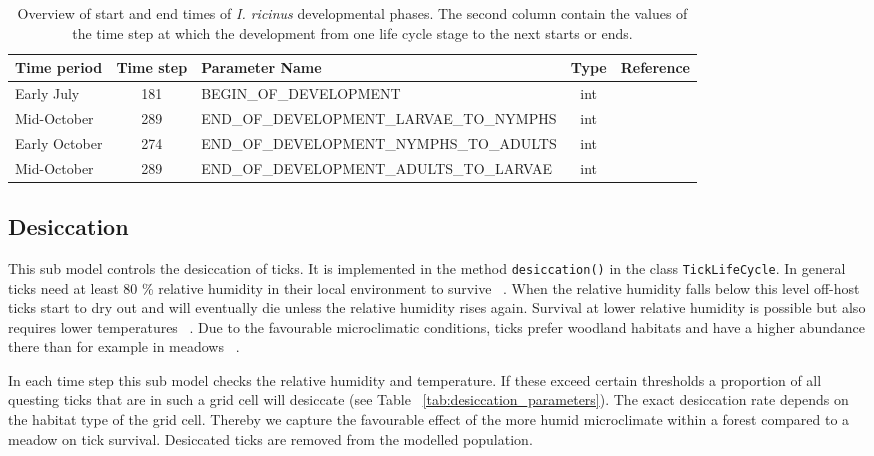 \documentclass[a4paper, 11pt]{scrartcl}
\newcommand{\inlinecode}[1]{\texttt{\small #1}}
\begin{document}
\begin{table}[h!]
\caption[Overview of start and end times of \emph{I. ricinus} developmental phases.]{Overview of start and end times of \emph{I. ricinus} developmental phases. The second column contain the values of the time step at which the development from one life cycle stage to the next starts or ends.}
\label{tab:development_parameters}
\begin{tabularx}{\textwidth}{lclcl}
\toprule
\textbf{Time period} 	& \textbf{Time step} & \textbf{Parameter Name}							& \textbf{Type}    & \textbf{Reference} \\
\midrule
Early July   			& 181   			 & \tiny{BEGIN\_OF\_DEVELOPMENT}					& int      & \textcite{Kahl}   		\\
Mid-October     		& 289      			 & \tiny{END\_OF\_DEVELOPMENT\_LARVAE\_TO\_NYMPHS}	& int      & \textcite{Kahl}      	\\
Early October    		& 274    			 & \tiny{END\_OF\_DEVELOPMENT\_NYMPHS\_TO\_ADULTS}	& int      & \textcite{Kahl}     	\\
Mid-October     		& 289      			 & \tiny{END\_OF\_DEVELOPMENT\_ADULTS\_TO\_LARVAE}	& int      & \textcite{Kahl}			\\
\bottomrule
\end{tabularx}
\end{table}

\subsection{Desiccation}
This sub model controls the desiccation of ticks. It is implemented in the method \inlinecode{desiccation()} in the class \inlinecode{TickLifeCycle}. In general ticks need at least 80 \% relative humidity in their local environment to survive ~\parencite{Medlock.2013, Gray.2016, Hauser.2018}. When the relative humidity falls below this level off-host ticks start to dry out and will eventually die unless the relative humidity rises again. Survival at lower relative humidity is possible but also requires lower temperatures ~\parencite{Ostfeld.2015}. Due to the favourable microclimatic conditions, ticks prefer woodland habitats and have a higher abundance there than for example in meadows ~\parencite{Lindstrom.2003, Boehnke.2015}.

In each time step this sub model checks the relative humidity and temperature. If these exceed certain thresholds a proportion of all questing ticks that are in such a grid cell will desiccate (see Table ~\ref{tab:desiccation_parameters}). The exact desiccation rate depends on the habitat type of the grid cell. Thereby we capture the favourable effect of the more humid microclimate within a forest compared to a meadow on tick survival. Desiccated ticks are removed from the modelled population.
\end{document}
